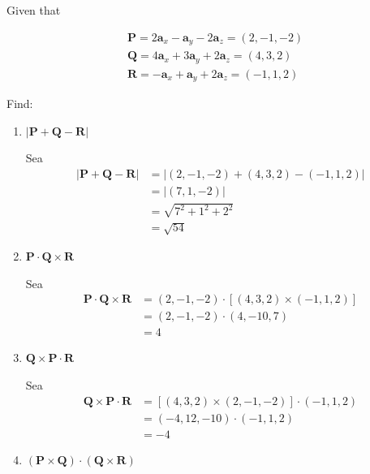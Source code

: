 \begin{problema}
Given that

$$
\begin{aligned}
& \mathbf{P}=2 \mathbf{a}_{x}-\mathbf{a}_{y}-2 \mathbf{a}_{z} = (2,-1,-2) \\
& \mathbf{Q}=4 \mathbf{a}_{x}+3 \mathbf{a}_{y}+2 \mathbf{a}_{z} = (4,3,2)\\
& \mathbf{R}=-\mathbf{a}_{x}+\mathbf{a}_{y}+2 \mathbf{a}_{z} = (-1,1,2)
\end{aligned}
$$

Find:
\begin{enumerate}
    \item $|\mathbf{P}+\mathbf{Q}-\mathbf{R}|$
    \begin{sol}
        Sea 
        \begin{align*}
            |\mathbf{P}+\mathbf{Q}-\mathbf{R}| &= |(2,-1,-2)+(4,3,2)-(-1,1,2)|\\
            &= |(7,1,-2)|\\
            &= \sqrt{7^2+1^2+2^2}\\
            &= \sqrt{54}
        \end{align*}
    \end{sol}
    \item $\mathbf{P} \cdot \mathbf{Q} \times \mathbf{R}$
    \begin{sol}
        Sea 
        \begin{align*}
            \mathbf{P} \cdot \mathbf{Q} \times \mathbf{R} &= (2,-1,-2)\cdot \left[(4,3,2)\times (-1,1,2)\right]\\
            &= (2,-1,-2)\cdot (4,-10,7)\\
            &= 4
        \end{align*}
    \end{sol}
    \item $\mathbf{Q} \times \mathbf{P}  \cdot \mathbf{R}$
    \begin{sol}
        Sea 
        \begin{align*}
            \mathbf{Q} \times \mathbf{P}  \cdot \mathbf{R} &= \left[(4,3,2)\times (2,-1,-2)\right]\cdot(-1,1,2)\\
            &=(-4,12,-10)\cdot(-1,1,2)\\
            &= -4
        \end{align*}
    \end{sol}
    \item $(\mathbf{P} \times \mathbf{Q}) \cdot(\mathbf{Q} \times \mathbf{R})$
    \begin{sol}

\end{sol}
\end{enumerate}
\end{problema}

